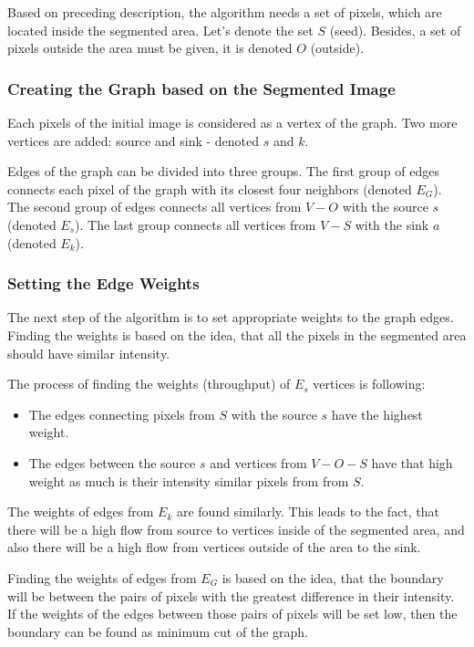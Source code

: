 Based on preceding description, the algorithm needs a set of pixels, which are located inside the segmented area. Let's denote the set $S$ (seed). Besides, a set of pixels outside the area must be given, it is denoted $O$ (outside)\cite{loucky}.

\subsubsection{Creating the Graph based on the Segmented Image}
Each pixels of the initial image is considered as a vertex of the graph. Two more vertices are added: source and sink - denoted $s$ and $k$.

Edges of the graph can be divided into three groups. The first group of edges connects each pixel of the graph with its closest four neighbors (denoted $E_{G}$). The second group of edges connects all vertices from $V - O$ with the source $s$ (denoted $E_{s}$). The last group connects all vertices from $V - S$ with the sink $a$ (denoted $E_{k}$).

\subsubsection{Setting the Edge Weights}
The next step of the algorithm is to set appropriate weights to the graph edges. Finding the weights is based on the idea, that all the pixels in the segmented area should have similar intensity. 

The process of finding the weights (throughput) of $E_{s}$ vertices is following\cite{loucky}:
\begin{itemize}
\item The edges connecting pixels from $S$ with the source $s$ have the highest weight.
\item The edges between the source $s$ and vertices from $V - O - S$ have that high weight as much is their intensity similar pixels from from $S$.
\end{itemize}
The weights of edges from $E_{k}$ are found similarly. This leads to the fact, that there will be a high flow from source to vertices inside of the segmented area, and also there will be a high flow from vertices outside of the area to the sink.

Finding the weights of edges from $E_{G}$ is based on the idea, that the boundary will be between the pairs of pixels with the greatest difference in their intensity. If the weights of the edges between those pairs of pixels will be set low, then the boundary can be found as minimum cut of the graph.

